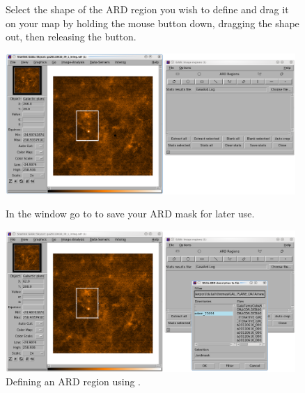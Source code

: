 \documentclass[11pt,oneside,chapters]{starlink}
\begin{document}
\begin{figure}[ht!]
\begin{center}
\begin{fmpage}{0.99\linewidth}
\hspace{0.1cm}
\begin{minipage}[c]{0.23\linewidth}
Select the shape of the ARD region you wish to define and drag it on
your map by holding the mouse button down, dragging the shape out,
then releasing the button.
\end{minipage}
\hspace{0.2cm}
\begin{minipage}[c]{0.72\linewidth}
\centering
\includegraphics[width=0.98\textwidth]{sc20_ard3.eps}
\vspace{0.2cm}
\end{minipage}

\vspace{0.5cm}


\hspace{0.1cm}
\begin{minipage}[c]{0.23\linewidth}
In the  window go to  to save your ARD mask for later use.
\end{minipage}
\hspace{0.2cm}
\begin{minipage}[c]{0.72\linewidth}
\centering
\includegraphics[width=0.98\textwidth]{sc20_ard4.eps}
\vspace{0.2cm}
\end{minipage}

\end{fmpage}
\end{center}
\caption[Defining an ARD region using \gaia]{\small Defining an ARD
region using \gaia.}
\label{fig:ardmask}
\end{figure}
\end{document}
